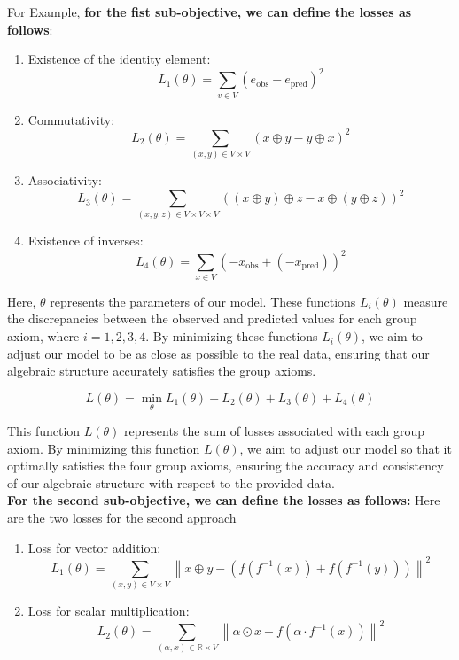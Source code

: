 \documentclass{report}
\begin{document}
    For Example, \textbf{for the fist sub-objective, we can define the losses as follows}:

    \begin{enumerate}
        \item Existence of the identity element:  \[
            L_1(\theta) = \sum_{v \in V} (e_{\text{obs}} - e_{\text{pred}})^2
            \]
        \item Commutativity:
        \[
        L_2(\theta) = \sum_{(x, y) \in V \times V} (x \oplus y - y \oplus x)^2
        \]
        \item Associativity:
        \[
        L_3(\theta) = \sum_{(x, y, z) \in V \times V \times V} ((x \oplus y) \oplus z - x \oplus (y \oplus z))^2
        \]
        \item Existence of inverses:
        \[
        L_4(\theta) = \sum_{x \in V} (-x_{\text{obs}} + (-x_{\text{pred}}))^2
        \] 
    \end{enumerate}
    
    Here, $\theta$ represents the parameters of our model.
    These functions $L_i(\theta)$ measure the discrepancies
    between the observed and predicted values for each group 
    axiom, where $i = 1, 2, 3, 4$. By minimizing these functions
    $L_i(\theta)$, we aim to adjust our model to be as close as
    possible to the real data, ensuring that our algebraic 
    structure accurately satisfies the group axioms. 

    $$
    L(\theta) = \min_{\theta} L_1(\theta) + L_2(\theta) + L_3(\theta) + L_4(\theta)
    $$


    This function $L(\theta)$ represents the sum of losses 
    associated with each group axiom. By minimizing 
    this function $L(\theta)$, we aim to adjust our model so
    that it optimally satisfies the four group axioms, 
    ensuring the accuracy and consistency of our 
    algebraic structure with respect to the provided data.\\


    \textbf{For the second sub-objective, we can define the losses as follows:}
    Here are the two losses for the second approach
  \begin{enumerate}
    \item Loss for vector addition:
    \[
    L_1(\theta) = \sum_{(x, y) \in V \times V} \left\lVert x \oplus y - \left(f(f^{-1}(x)) + f(f^{-1}(y))\right) \right\rVert^2
    \]
    \item Loss for scalar multiplication:
    \[
    L_2(\theta) = \sum_{(\alpha, x) \in \mathbb{R} \times V} \left\lVert \alpha \odot x - f(\alpha \cdot f^{-1}(x)) \right\rVert^2
    \]
\end{enumerate}
\end{document}
